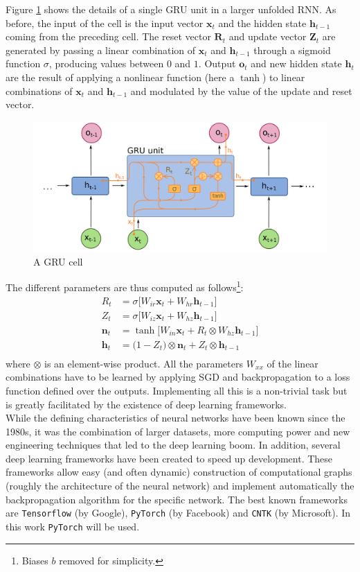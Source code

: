 Figure \ref{fig:gru_cell} shows the details of a single GRU unit in a larger unfolded RNN. As before, the input of the cell is the input vector $\bm{x}_t$ and the hidden state $\bm{h}_{t-1}$ coming from the preceding cell. The reset vector $\bm{R}_t$ and update vector $\bm{Z}_t$ are generated by passing a linear combination of $\bm{x}_t$ and $\bm{h}_{t-1}$ through a sigmoid function $\sigma$, producing values between $0$ and $1$. Output $\bm{o}_t$ and new hidden state $\bm{h}_t$ are the result of applying a nonlinear function (here a $\tanh$) to linear combinations of $\bm{x}_t$ and $\bm{h}_{t-1}$ and modulated by the value of the update and reset vector.\\

\begin{figure}[htp]
    \centering
    \includegraphics[width=14cm]{images/gru.png}
    \caption{A GRU cell}
    \label{fig:gru_cell}
\end{figure}

The different parameters are thus computed as follows\footnote{Biases $b$ removed for simplicity.}:
\begin{align*}
        R_t &= \sigma\Big [ W_{ir} \bm{x}_t + W_{hr} \bm{h}_{t-1} \Big ] \\
        Z_t &= \sigma \Big [ W_{iz} \bm{x}_t + W_{hz} \bm{h}_{t-1} \Big ] \\
        \bm{n}_t &= \tanh \Big [ W_{in} \bm{x}_t + R_t \otimes W_{hz} \bm{h}_{t-1} \Big ] \\
        \bm{h}_t &= \big ( 1-Z_t \big ) \otimes \bm{n}_t + Z_t \otimes \bm{h}_{t-1} \\
\end{align*}
where $\otimes$ is an element-wise product. All the parameters $W_{xx}$ of the linear combinations have to be learned by applying SGD and backpropagation to a loss function defined over the outputs. Implementing all this is a non-trivial task but is greatly facilitated by the existence of deep learning frameworks.\\
While the defining characteristics of neural networks have been known since the 1980s, it was the combination of larger datasets, more computing power and new engineering techniques that led to the deep learning boom. In addition, several deep learning frameworks have been created to speed up development. These frameworks allow easy (and often dynamic) construction of computational graphs (roughly the architecture of the neural network) and implement automatically the backpropagation algorithm for the specific network. The best known frameworks are {\tt Tensorflow} (by Google), {\tt PyTorch} (by Facebook) and {\tt CNTK} (by Microsoft). In this work {\tt PyTorch} will be used.

